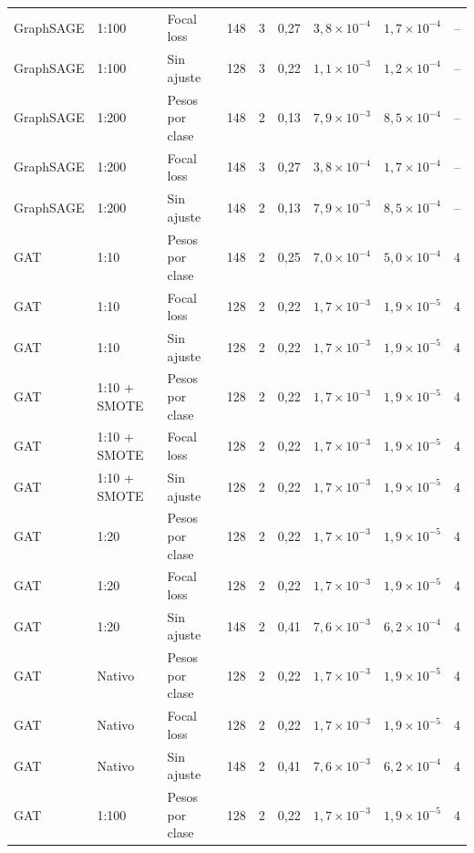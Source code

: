 \begin{longtable}{lllcccccc}
GraphSAGE & 1:100 & Focal loss & 148 & 3 & 0{,}27 & $3{,}8 \times 10^{-4}$ & $1{,}7 \times 10^{-4}$ & -- \\
GraphSAGE & 1:100 & Sin ajuste & 128 & 3 & 0{,}22 & $1{,}1 \times 10^{-3}$ & $1{,}2 \times 10^{-4}$ & -- \\
GraphSAGE & 1:200 & Pesos por clase & 148 & 2 & 0{,}13 & $7{,}9 \times 10^{-3}$ & $8{,}5 \times 10^{-4}$ & -- \\
GraphSAGE & 1:200 & Focal loss & 148 & 3 & 0{,}27 & $3{,}8 \times 10^{-4}$ & $1{,}7 \times 10^{-4}$ & -- \\
GraphSAGE & 1:200 & Sin ajuste & 148 & 2 & 0{,}13 & $7{,}9 \times 10^{-3}$ & $8{,}5 \times 10^{-4}$ & -- \\
\midrule
GAT & 1:10 & Pesos por clase & 148 & 2 & 0{,}25 & $7{,}0 \times 10^{-4}$ & $5{,}0 \times 10^{-4}$ & 4 \\
GAT & 1:10 & Focal loss & 128 & 2 & 0{,}22 & $1{,}7 \times 10^{-3}$ & $1{,}9 \times 10^{-5}$ & 4 \\
GAT & 1:10 & Sin ajuste & 128 & 2 & 0{,}22 & $1{,}7 \times 10^{-3}$ & $1{,}9 \times 10^{-5}$ & 4 \\
GAT & 1:10 + SMOTE & Pesos por clase & 128 & 2 & 0{,}22 & $1{,}7 \times 10^{-3}$ & $1{,}9 \times 10^{-5}$ & 4 \\
GAT & 1:10 + SMOTE & Focal loss & 128 & 2 & 0{,}22 & $1{,}7 \times 10^{-3}$ & $1{,}9 \times 10^{-5}$ & 4 \\
GAT & 1:10 + SMOTE & Sin ajuste & 128 & 2 & 0{,}22 & $1{,}7 \times 10^{-3}$ & $1{,}9 \times 10^{-5}$ & 4 \\
GAT & 1:20 & Pesos por clase & 128 & 2 & 0{,}22 & $1{,}7 \times 10^{-3}$ & $1{,}9 \times 10^{-5}$ & 4 \\
GAT & 1:20 & Focal loss & 128 & 2 & 0{,}22 & $1{,}7 \times 10^{-3}$ & $1{,}9 \times 10^{-5}$ & 4 \\
GAT & 1:20 & Sin ajuste & 148 & 2 & 0{,}41 & $7{,}6 \times 10^{-3}$ & $6{,}2 \times 10^{-4}$ & 4 \\
GAT & Nativo & Pesos por clase & 128 & 2 & 0{,}22 & $1{,}7 \times 10^{-3}$ & $1{,}9 \times 10^{-5}$ & 4 \\
GAT & Nativo & Focal loss & 128 & 2 & 0{,}22 & $1{,}7 \times 10^{-3}$ & $1{,}9 \times 10^{-5}$ & 4 \\
GAT & Nativo & Sin ajuste & 148 & 2 & 0{,}41 & $7{,}6 \times 10^{-3}$ & $6{,}2 \times 10^{-4}$ & 4 \\
GAT & 1:100 & Pesos por clase & 128 & 2 & 0{,}22 & $1{,}7 \times 10^{-3}$ & $1{,}9 \times 10^{-5}$ & 4 \\

\end{longtable}
